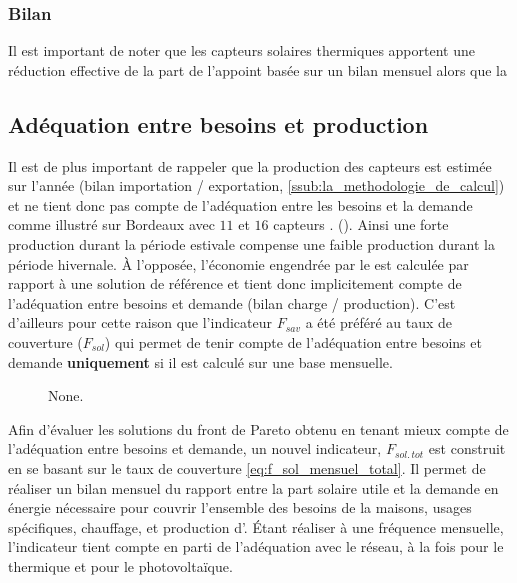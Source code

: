 \subsubsection{Bilan} %
\label{ssub:bilan}
Il est important de noter que les capteurs solaires thermiques
apportent une réduction
effective de la part de l’appoint basée sur un bilan mensuel alors que la



\subsection{Adéquation entre besoins et production} %
\label{sub:adequation_entre_besoins_et_production}
Il est de plus important de rappeler que la production des capteurs  est estimée
sur l’année (bilan importation / exportation, \ref{ssub:la_methodologie_de_calcul}) et ne
tient donc pas compte de l’adéquation entre les besoins et la demande comme illustré sur
Bordeaux avec $11$ et $16$ capteurs .
(). Ainsi une forte production durant la période estivale
compense une faible production durant la période hivernale. À l’opposée, l’économie
engendrée par le  est calculée par rapport à une solution de référence et tient
donc implicitement compte de l’adéquation entre besoins et demande (bilan charge /
production). C’est d’ailleurs pour cette raison que l’indicateur $F_{sav}$ a été préféré
au taux de couverture ($F_{sol}$) qui permet de tenir compte de l’adéquation entre besoins
et demande \textbf{uniquement} si il est calculé sur une base mensuelle.

\begin{figure}
    \centering
    \caption[None]
             {None.}
    \label{fig:evolution_usages_pv}
\end{figure}


Afin d’évaluer les solutions du front de Pareto obtenu en tenant mieux compte de
l’adéquation entre besoins et demande, un nouvel indicateur, $F_{sol.\, tot}$ est construit
en se basant sur le taux de couverture \eqref{eq:f_sol_mensuel_total}. Il permet
de réaliser un bilan mensuel du rapport entre la part solaire utile et la demande en
énergie nécessaire pour couvrir l’ensemble des besoins de la maisons, usages spécifiques,
chauffage, et production d’. Étant réaliser à une fréquence mensuelle, l’indicateur
tient compte en parti de l’adéquation avec le réseau, à la fois pour le thermique et
pour le photovoltaïque.


